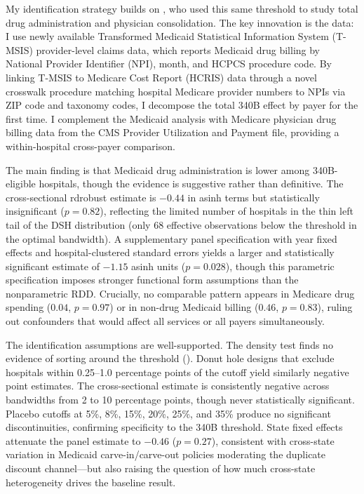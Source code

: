 \documentclass[12pt]{article}
\begin{document}
My identification strategy builds on \citet{nikpay2018effect}, who used this same threshold to study total drug administration and physician consolidation. The key innovation is the data: I use newly available Transformed Medicaid Statistical Information System (T-MSIS) provider-level claims data, which reports Medicaid drug billing by National Provider Identifier (NPI), month, and HCPCS procedure code. By linking T-MSIS to Medicare Cost Report (HCRIS) data through a novel crosswalk procedure matching hospital Medicare provider numbers to NPIs via ZIP code and taxonomy codes, I decompose the total 340B effect by payer for the first time. I complement the Medicaid analysis with Medicare physician drug billing data from the CMS Provider Utilization and Payment file, providing a within-hospital cross-payer comparison.

The main finding is that Medicaid drug administration is lower among 340B-eligible hospitals, though the evidence is suggestive rather than definitive. The cross-sectional rdrobust estimate is $-0.44$ in asinh terms but statistically insignificant ($p = 0.82$), reflecting the limited number of hospitals in the thin left tail of the DSH distribution (only 68 effective observations below the threshold in the optimal bandwidth). A supplementary panel specification with year fixed effects and hospital-clustered standard errors yields a larger and statistically significant estimate of $-1.15$ asinh units ($p = 0.028$), though this parametric specification imposes stronger functional form assumptions than the nonparametric RDD. Crucially, no comparable pattern appears in Medicare drug spending ($0.04$, $p = 0.97$) or in non-drug Medicaid billing ($0.46$, $p = 0.83$), ruling out confounders that would affect all services or all payers simultaneously.

The identification assumptions are well-supported. The \citet{cattaneo2020simple} density test finds no evidence of sorting around the threshold (). Donut hole designs that exclude hospitals within 0.25--1.0 percentage points of the cutoff yield similarly negative point estimates. The cross-sectional estimate is consistently negative across bandwidths from 2 to 10 percentage points, though never statistically significant. Placebo cutoffs at 5\%, 8\%, 15\%, 20\%, 25\%, and 35\% produce no significant discontinuities, confirming specificity to the 340B threshold. State fixed effects attenuate the panel estimate to $-0.46$ ($p = 0.27$), consistent with cross-state variation in Medicaid carve-in/carve-out policies moderating the duplicate discount channel---but also raising the question of how much cross-state heterogeneity drives the baseline result.
\end{document}
